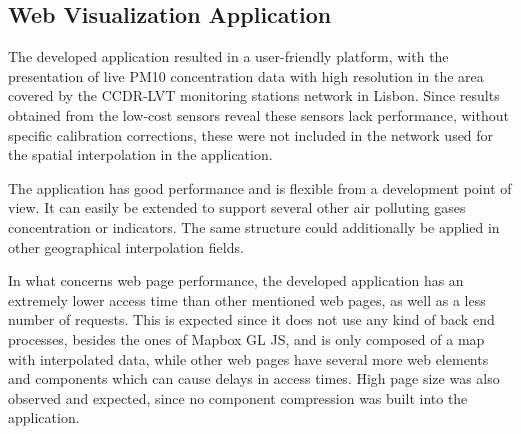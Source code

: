 








\subsection{Web Visualization Application}

The developed application resulted in a user-friendly platform, with the presentation of live PM10 concentration data with high resolution in the area covered by the CCDR-LVT monitoring stations network in Lisbon.
Since results obtained from the low-cost sensors reveal these sensors lack performance, without specific calibration corrections, these were not included in the network used for the spatial interpolation in the application.




The application has good performance and is flexible from a development point of view. It can easily be extended to support several other air polluting gases concentration or indicators. The same structure could additionally be applied in other geographical interpolation fields.

In what concerns web page performance, the developed application has an extremely lower access time than other mentioned web pages, as well as a less number of requests. This is expected since it does not use any kind of back end processes, besides the ones of Mapbox GL JS, and is only composed of a map with interpolated data, while other web pages have several more web elements and components which can cause delays in access times. High page size was also observed and expected, since no component compression was built into the application.

